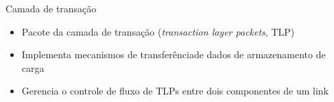 \begin{slide}{Camada de transação}
	\begin{itemize}
		\item Pacote da camada de transação (\textit{transaction layer packets}, TLP)
		\item Implementa mecanismos de transferênciade dados de armazenamento de carga
		\item Gerencia o controle de fluxo de TLPs entre dois componentes de um link
	\end{itemize}
\end{slide}

